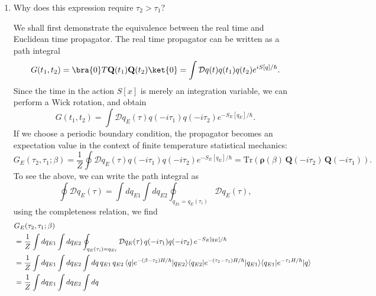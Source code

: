     \begin{enumerate}[label=\alph*)]
    
        \item Why does this expression require $\tau_2 > \tau_1$?
        \begin{solution}
        We shall first demonstrate the equivalence between the real time and Euclidean time propagator. The real time propagator can be written as a path integral 
        \begin{equation}
            G(t_1,t_2) = \bra{0}T\mathbf{Q}(t_1)\mathbf{Q}(t_2)\ket{0} = \int\mathcal{D}q(t)q(t_1)q(t_2)e^{iS[q]/\hbar}.
        \end{equation}
        Since the time in the action $S[x]$ is merely an integration variable, we can perform a Wick rotation, and obtain
        \begin{equation}
            G(t_1,t_2) = \int\mathcal{D}q_E(\tau)q(-i\tau_1)q(-i\tau_2)e^{-S_E[q_E]/\hbar}.
        \end{equation}
       If we choose a periodic boundary condition, the propagator becomes an expectation value in the context of finite temperature statistical mechanics:
        \begin{equation}
            G_E(\tau_2, \tau_1;\beta) =\frac{1}{Z} \oint\mathcal{D}q_E(\tau)q(-i\tau_1)q(-i\tau_2)e^{-S_E[q_E]/\hbar} = \mathrm{Tr}\!\left(\boldsymbol{\rho}(\beta)\,\mathbf{Q}(-i\tau_2)\,\mathbf{Q}(-i\tau_1)\right).
        \end{equation}
        To see the above, we can write the path integral as 
        \begin{equation}
            \oint\mathcal{D}q_E(\tau) = \int dq_{E1}\int dq_{E2}\oint_{q_{Ei} = q_E(\tau_i)}\mathcal{D}q_E(\tau),
        \end{equation}
        using the completeness relation, we find
        \begin{align}
        &G_E(\tau_2, \tau_1;\beta ) \notag\\
        &= \frac{1}{Z}  \int dq_{E1}\int dq_{E2}
           \oint_{q_E(\tau_i)=q_{Ei}}\mathcal{D}q_E(\tau)\,
           q(-i\tau_1)q(-i\tau_2)\,e^{-S_E[q_E]/\hbar} \notag\\
           &= \frac{1}{Z} \int dq_{E1}\int dq_{E2}\int dq\, q_{E1}\,q_{E2}\,
           \langle q|e^{-(\beta-\tau_2)H/\hbar}|q_{E2}\rangle
           \langle q_{E2}|e^{-(\tau_2-\tau_1)H/\hbar}|q_{E1}\rangle
           \langle q_{E1}|e^{-\tau_1 H/\hbar}|q\rangle \notag\\
           &= \frac{1}{Z} \int dq_{E1}\int dq_{E2}\int dq\, 

\end{align}
\end{solution}
\end{enumerate}
